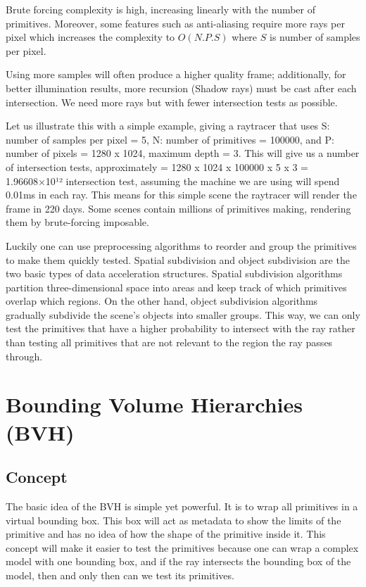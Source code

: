 \documentclass[11pt,a4paper]{article}
\begin{document}
Brute forcing complexity is high, increasing linearly with the number of primitives. Moreover, some features such as anti-aliasing require more rays per pixel which increases the complexity to  $O(N.P.S)$ where $S$ is number of samples per pixel. 
\\
\noindent

Using more samples will often produce a higher quality frame; additionally, for better illumination results, more recursion (Shadow rays) must be cast after each intersection. We need more rays but with fewer intersection tests as possible.
\\
\noindent

Let us illustrate this with a simple example, giving a raytracer that uses S: number of samples per pixel = 5, N: number of primitives = 100000, and P: number of pixels =  1280 x 1024, maximum depth = 3. This will give us a number of intersection tests, approximately = 1280 x 1024 x 100000 x 5 x 3 = 1.96608×10¹² intersection test, assuming the machine we are using will spend 0.01ms in each ray. This means for this simple scene the raytracer will render the frame in 220 days. Some scenes contain millions of primitives making, rendering them by brute-forcing imposable. 
\\
\noindent
 
Luckily one can use preprocessing algorithms to reorder and group the primitives to make them quickly tested. Spatial subdivision and object subdivision are the two basic types of data acceleration structures. Spatial subdivision algorithms partition three-dimensional space into areas and keep track of which primitives overlap which regions. On the other hand, object subdivision algorithms gradually subdivide the scene's objects into smaller groups. This way, we can only test the primitives that have a higher probability to intersect with the ray rather than testing all primitives that are not relevant to the region the ray passes through. 

\clearpage

\section{Bounding Volume Hierarchies (BVH)}
\subsection{Concept}
The basic idea of the BVH is simple yet powerful. It is to wrap all primitives in a virtual bounding box. This box will act as metadata to show the limits of the primitive and has no idea of how the shape of the primitive inside it. This concept will make it easier to test the primitives because one can wrap a complex model with one bounding box, and if the ray intersects the bounding box of the model, then and only then can we test its primitives.
\end{document}

